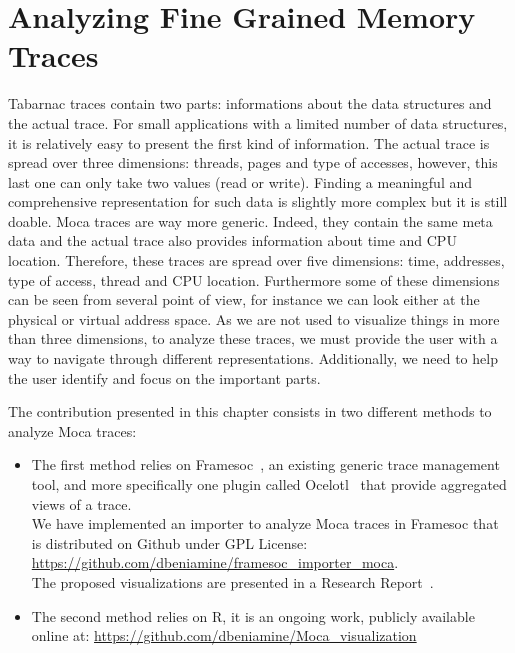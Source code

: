 \chapter{Analyzing Fine Grained Memory Traces}
\label{chap:analyzing}

\gls{Tabarnac} traces contain two parts: informations about the data structures and the actual trace.
For small applications with a limited number of data structures, it is relatively easy to present the first kind of information.
The actual trace is spread over three dimensions: threads, pages and type of accesses, however, this last one can only take two values (read or write).
Finding a meaningful and comprehensive representation for such data is slightly more complex but it is still doable.
\gls{Moca} traces are way more generic.
Indeed, they contain the same meta data and the actual trace also provides information about time and \gls{CPU} location.
Therefore, these traces are spread over five dimensions: time, addresses, type of access, thread and \gls{CPU} location.
Furthermore some of these dimensions can be seen from several point of view, for instance we can look either at the physical or virtual address space.
As we are not used to visualize things in more than three dimensions, to analyze these traces, we must provide the user with a way to navigate through different representations.
Additionally, we need to help the user identify and focus on the important parts.

The contribution presented in this chapter consists in two different methods to analyze \gls{Moca} traces:
\begin{itemize}
    \item The first method relies on \gls{Framesoc}~\cite{Pagano14frameSoC}, an existing generic trace management tool, and more specifically one plugin called \gls{Ocelotl}~\cite{Dosimont14Ocelotl} that provide aggregated views of a trace.\\
        We have implemented an importer to analyze \gls{Moca} traces in \gls{Framesoc} that is distributed on Github under GPL License:\\
        \url{https://github.com/dbeniamine/framesoc\_importer\_moca}.\\
        The proposed visualizations are presented in a Research Report~\cite{Beniamine15Memory}.
    \item The second method relies on \gls{R}, it is an ongoing work, publicly available online at:
        \url{https://github.com/dbeniamine/Moca\_visualization}
\end{itemize}

